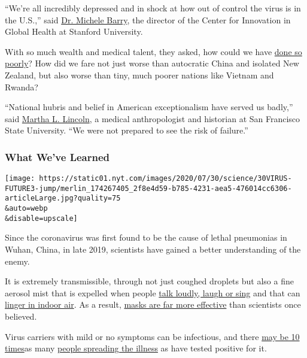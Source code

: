 ``We're all incredibly depressed and in shock at how out of control the
virus is in the U.S.,'' said
\href{https://profiles.stanford.edu/michele-barry}{Dr. Michele Barry},
the director of the Center for Innovation in Global Health at Stanford
University.

With so much wealth and medical talent, they asked, how could we have
\href{https://www.nytimes.com/2020/07/10/us/daily-virus-death-toll-rises-in-some-states.html}{done
so poorly}? How did we fare not just worse than autocratic China and
isolated New Zealand, but also worse than tiny, much poorer nations like
Vietnam and Rwanda?

``National hubris and belief in American exceptionalism have served us
badly,'' said
\href{https://anthropology.sfsu.edu/people/faculty/martha-lincoln}{Martha
L. Lincoln}, a medical anthropologist and historian at San Francisco
State University. ``We were not prepared to see the risk of failure.''

\hypertarget{what-weve-learned}{%
\subsubsection{What We've Learned}\label{what-weve-learned}}

\texttt{[image: https://static01.nyt.com/images/2020/07/30/science/30VIRUS-FUTURE3-jump/merlin\_174267405\_2f8e4d59-b785-4231-aea5-476014cc6306-articleLarge.jpg?quality=75\\\&auto=webp\\\&disable=upscale]}

Since the coronavirus was first found to be the cause of lethal
pneumonias in Wuhan, China, in late 2019, scientists have gained a
better understanding of the enemy.

It is extremely transmissible, through not just coughed droplets but
also a fine aerosol mist that is expelled when people
\href{https://www.nytimes.com/2020/05/14/health/coronavirus-infections.html}{talk
loudly, laugh or sing} and that can
\href{https://www.nytimes.com/2020/07/04/health/239-experts-with-one-big-claim-the-coronavirus-is-airborne.html}{linger
in indoor air}. As a result,
\href{https://www.nytimes.com/2020/07/27/health/coronavirus-mask-protection.html}{masks
are far more effective} than scientists once believed.

Virus carriers with mild or no symptoms can be infectious, and there
\href{https://khn.org/morning-breakout/number-of-americans-infected-with-virus-could-be-10-times-higher-than-official-count-cdc-chief-warns/}{may
be 10 times}as many
\href{https://www.nytimes.com/2020/07/21/health/coronavirus-infections-us.html}{people
spreading the illness} as have tested positive for it.

